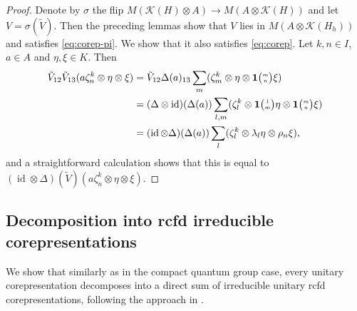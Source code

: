 \documentclass[11pt]{article}
\DeclareMathOperator{\id}{id}
\newcommand{\Grt}[3]{#1{\tiny {\begin{pmatrix} #2\\#3\end{pmatrix}}}}
\newcommand{\UnitC}[2]{\Grt{\mathbf{1}}{#1}{#2}}
\theoremstyle{definition}
\numberwithin{equation}{section}
\begin{document}
 \begin{proof}
   Denote by $\sigma$ the flip $ M(\mathcal{K}(H) \otimes A) \to M(A
   \otimes \mathcal{K}(H))$ and let $V=\sigma(\tilde V)$. Then the
   preceding lemmas show that $V$ lies in $M(A\otimes
   \mathcal{K}(H_{h}))$ and satisfies \eqref{eq:corep-pi}. We show
   that it also satisfies \eqref{eq:corep}. Let $k,n\in I$, $a\in A$ and $\eta,\xi \in K$. Then
 \begin{align*}
\tilde V_{12}\tilde V_{13}(a\zeta^{k}_{n} \otimes \eta\otimes \xi) &=
\tilde V_{12} \Delta(a)_{13}\sum_{m}(\zeta^{k}_{m} \otimes \eta \otimes \UnitC{m}{n}\xi) \\
&= (\Delta \otimes \id)(\Delta(a)) \sum_{l,m} (\zeta^{k}_{l} \otimes \UnitC{l}{m}\eta \otimes
\UnitC{m}{n}\xi)  \\
&= (\id \otimes \Delta)(\Delta(a))  \sum_{l} (\zeta^{k}_{l} \otimes \lambda_{l}\eta \otimes
\rho_{n}\xi),
\end{align*}
and a straightforward calculation shows that this is equal to $(\id \otimes \Delta)(\tilde
V)(a\zeta^{k}_{n} \otimes \eta\otimes \xi)$.
 \end{proof}

\subsection{Decomposition into rcfd irreducible corepresentations}

We show that similarly as in the compact quantum group case, every unitary
corepresentation decomposes into a direct sum of irreducible
unitary rcfd corepresentations,  following the approach in \cite{MVD1}.
\end{document}
